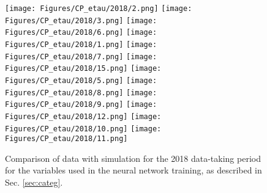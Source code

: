 
\begin{figure}[H]
    \centering
    \texttt{[image: Figures/CP\_etau/2018/2.png]}
    \texttt{[image: Figures/CP\_etau/2018/3.png]}
    \texttt{[image: Figures/CP\_etau/2018/6.png]}    \texttt{[image: Figures/CP\_etau/2018/1.png]}
    \texttt{[image: Figures/CP\_etau/2018/7.png]}
    \texttt{[image: Figures/CP\_etau/2018/15.png]}
    \texttt{[image: Figures/CP\_etau/2018/5.png]}
    \texttt{[image: Figures/CP\_etau/2018/8.png]}
    \texttt{[image: Figures/CP\_etau/2018/9.png]}
    \texttt{[image: Figures/CP\_etau/2018/12.png]}
    \texttt{[image: Figures/CP\_etau/2018/10.png]}
    \texttt{[image: Figures/CP\_etau/2018/11.png]}
    \caption{Comparison of data with simulation for the 2018 data-taking period for the variables used in the neural network training, as described in Sec. \ref{sec:categ}.}
    \label{fig:nn_vars}
\end{figure}

